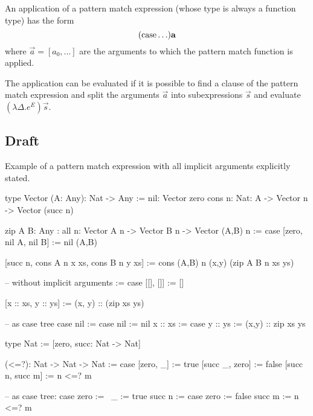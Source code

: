 An application of a pattern match expression (whose type is always a function
type) has the form
$$
({\text{case}} \ldots) {\mathbf a}
$$
where $\vec a = [a_0, \ldots]$ are the arguments to which the pattern match
function is applied.

The application can be evaluated if it is possible to find a clause of the
pattern match expression and split the arguments $\vec a$ into subexpressions
$\vec s$ and evaluate $(\lambda \Delta. e^E) \vec s$.




\subsection{Draft}

Example of a pattern match expression with all implicit arguments explicitly
stated.

\begin{alba}
    type Vector (A: Any): Nat -> Any :=
        nil: Vector zero
        cons {n: Nat}: A -> Vector n -> Vector (succ n)

    zip {A B: Any}
    : all {n}: Vector A n -> Vector B n -> Vector (A,B) n
    := case
        [{zero}, nil {A}, nil {B}] := nil {(A,B)}

        [{succ n}, cons {A} {n} x xs, cons {B} {n} y xs] :=
            cons {(A,B)} {n} (x,y) (zip {A} {B} {n} xs ys)

    -- without implicit arguments
    := case
        [[], []]           := []

        [x :: xs, y :: ys] := (x, y) :: (zip xs ys)

    -- as case tree
    case
        nil :=
            case nil :=
                nil
        x :: xs :=
            case y :: ys :=
                (x,y) :: zip xs ys
\end{alba}


\begin{alba}
    type Nat := [zero, succ: Nat -> Nat]

    (<=?): Nat -> Nat -> Nat := case
        [zero, _]        :=  true
        [succ _, zero]   :=  false
        [succ n, succ m] :=  n <=? m

    -- as case tree:
    case
        zero           :=   \ _ := true
        succ n :=
            case
                zero   :=   false
                succ m :=   n <=? m
\end{alba}

